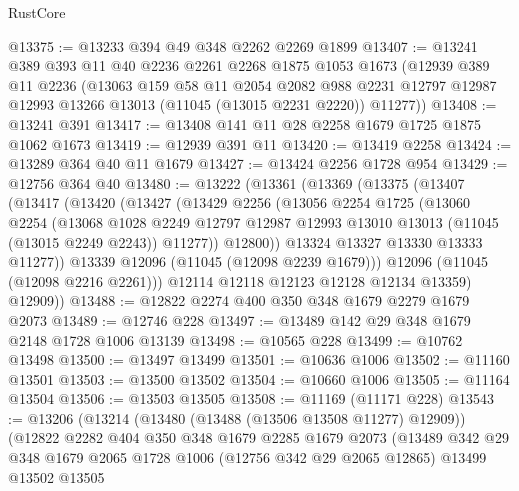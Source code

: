 \begin{lexlean}{RustCore}
\begin{coremodule}
@13375 := @13233 @394 @49 @348 @2262 @2269 @1899
@13407 := @13241
    @389
    @393
    @11
    @40
    @2236
    @2261
    @2268
    @1875
    @1053
    @1673
    (@12939
      @389
      @11
      @2236
      (@13063
        @159
        @58
        @11
        @2054
        @2082
        @988
        @2231
        @12797
        @12987
        @12993
        @13266
        @13013
        (@11045 (@13015 @2231 @2220))
        @11277))
@13408 := @13241 @391
@13417 := @13408 @141 @11 @28 @2258 @1679 @1725 @1875 @1062 @1673
@13419 := @12939 @391 @11
@13420 := @13419 @2258
@13424 := @13289 @364 @40 @11 @1679
@13427 := @13424 @2256 @1728 @954
@13429 := @12756 @364 @40
@13480 := @13222
    (@13361
      (@13369
        (@13375
          (@13407
            (@13417
              (@13420
                (@13427
                  (@13429
                    @2256
                    (@13056
                      @2254
                      @1725
                      (@13060
                        @2254
                        (@13068
                          @1028
                          @2249
                          @12797
                          @12987
                          @12993
                          @13010
                          @13013
                          (@11045 (@13015 @2249 @2243))
                          @11277))
                      @12800))
                  @13324
                  @13327
                  @13330
                  @13333
                  @11277))
              @13339
              @12096
              (@11045 (@12098 @2239 @1679)))
            @12096
            (@11045 (@12098 @2216 @2261)))
          @12114
          @12118
          @12123
          @12128
          @12134
          @13359)
        @12909))
@13488 := @12822 @2274 @400 @350 @348 @1679 @2279 @1679 @2073
@13489 := @12746 @228
@13497 := @13489 @142 @29 @348 @1679 @2148 @1728 @1006 @13139
@13498 := @10565 @228
@13499 := @10762 @13498
@13500 := @13497 @13499
@13501 := @10636 @1006
@13502 := @11160 @13501
@13503 := @13500 @13502
@13504 := @10660 @1006
@13505 := @11164 @13504
@13506 := @13503 @13505
@13508 := @11169 (@11171 @228)
@13543 := @13206
    (@13214
      (@13480 (@13488 (@13506 @13508 @11277) @12909))
      (@12822
        @2282
        @404
        @350
        @348
        @1679
        @2285
        @1679
        @2073
        (@13489
          @342
          @29
          @348
          @1679
          @2065
          @1728
          @1006
          (@12756 @342 @29 @2065 @12865)
          @13499
          @13502
          @13505

\end{coremodule}
\end{lexlean}
